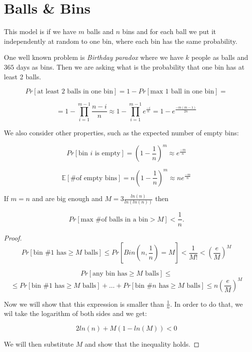 \chapter{Balls \& Bins}

This model is if we have $m$ balls and $n$ bins and for each ball we put it independently at random to one bin, where each bin has the same probability.

One well known problem is \textit{Birthday paradox} where we have $k$ people as balls and $365$ days as bins. Then we are asking what is the probability that one bin has at least 2 balls.

$$
Pr[\text{at least 2 balls in one bin}] = 1 - Pr[\text{max 1 ball in one bin}] =
$$

$$
= 1 - \prod_{i=1}^{m-1} \frac{n-i}{n} \approx 1 - \prod_{i=1}^{m-1} e^{\frac{-i}{n}} = 1 - e^{\frac{-m(m-1)}{2n}}
$$

We also consider other properties, such as the expected number of empty bins:

$$
Pr[\text{bin } i \text{ is empty}] = (1 - \frac{1}{n})^{m} \approx e^{\frac{-m}{n}}
$$

$$
\mathbb{E}[ \text{\# of empty bins}] = n (1- \frac{1}{n})^{m} \approx n e^{\frac{-m}{n}}
$$

\begin{thm}
	If $m=n$ and are big enough and $M = 3 \frac{ln(n)}{ln(ln(n))}$ then
	
	$$
	Pr[\text{max \# of balls in a bin} > M] < \frac{1}{n}.
	$$
\end{thm}

\begin{proof}
	
	$$
	Pr[\text{bin } \#1 \text{ has} \geq M \text{ balls} ]  \leq Pr[Bin(n, \frac{1}{n}) = M] < \frac{1}{M!} < (\frac{e}{M})^M
	$$
	
	$$
	Pr[\text{any bin has} \geq M \text{ balls} ] \leq 
	$$
	$$
	\leq Pr[\text{bin } \#1 \text{ has} \geq M \text{ balls} ] + \dots + Pr[\text{bin } \#n \text{ has} \geq M \text{ balls} ] \leq n (\frac{e}{M})^M
	$$
	
	Now we will show that this expression is smaller than $\frac{1}{n}$. In order to do that, we wil take the logarithm of both sides and we get:
	
	$$
	2ln(n) + M(1-ln(M)) < 0
	$$
	
	We will then substitute $M$ and show that the inequality holds.
\end{proof}



